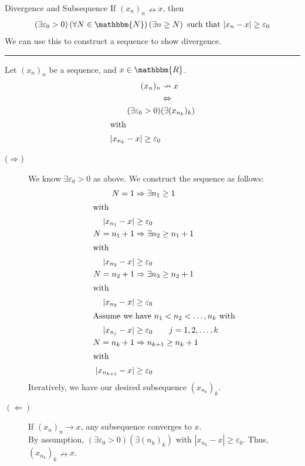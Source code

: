 \documentclass[10pt]{extarticle}
\newcommand{\N}{\mathbbm{N}}
\newcommand{\R}{\mathbbm{R}}
\begin{document}
  \begin{problem}{Divergence and Subsequence}
    If $(x_n)_n \nrightarrow x$, then
    \begin{align*}
      \left(\exists \varepsilon_0> 0\right)\left(\forall N\in\N\right)\left(\exists n\geq N\right) \text{ such that } |x_n-x| \geq \varepsilon_0
    \end{align*}
    We can use this to construct a sequence to show divergence.\\
    \vspace{4pt}
    \rule{\textwidth}{0.4pt}
    \vspace{4pt}
    Let $(x_n)_n$ be a sequence, and $x\in\R$.
    \begin{align*}
      (x_n)_n &\nrightarrow x \\
              &\Leftrightarrow\\
      (\exists \varepsilon_0>0)&(\exists (x_{n_k})_k)\\
      \shortintertext{with}
      |x_{n_k} - x| \geq \varepsilon_0
    \end{align*}
    \tcblower
    \begin{description}
      \item[($\Rightarrow$)] We know $\exists \varepsilon_0 > 0$ as above. We construct the sequence as follows:
        \begin{align*}
          N = 1 &\Rightarrow \exists n_1 \geq 1\\
          \shortintertext{with}
          |x_{n_1} - x |&\geq \varepsilon_0\\
          N = n_1 + 1 &\Rightarrow \exists n_2 \geq n_1 + 1\\
          \shortintertext{with}
          |x_{n_2} - x| &\geq \varepsilon_0\\
          N = n_2 + 1 &\Rightarrow \exists n_3 \geq n_2 + 1\\
          \shortintertext{with}
          |x_{n_3} - x| &\geq \varepsilon_0\\
          \shortintertext{Assume we have $n_1 < n_2< \dots, n_k$ with}
          |x_{n_j} - x| &\geq \varepsilon_0 \tag*{$j = 1,2,\dots,k$}\\
          N = n_k + 1 &\Rightarrow n_{k+1} \geq n_k + 1\\
          \shortintertext{with}
          |x_{n_{k+1}} - x| &\geq \varepsilon_0
        \end{align*}
        Iteratively, we have our desired subsequence $(x_{n_k})_k$.
      \item[$(\Leftarrow)$] If $(x_n)_n\rightarrow x$, any subsequence converges to $x$.\\

        By assumption, $\left(\exists \varepsilon_0 >0\right)\left(\exists (n_k)_k\right)$ with $|x_{n_k} - x| \geq \varepsilon_0$. Thus, $(x_{n_k})_k \nrightarrow x$.
    \end{description}
  \end{problem}
\end{document}
